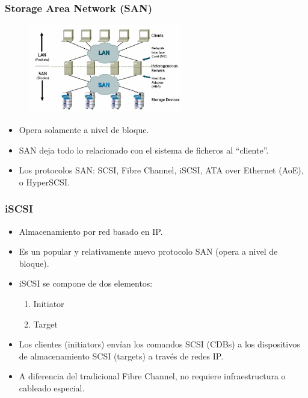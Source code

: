 \documentclass{beamer}
\begin{document}
\begin{frame}
  \frametitle{Storage Area Network (SAN)}

\begin{figure}[h]
\begin{center}
  \includegraphics[width=6.75cm]{figs/SAN.png}
\end{center}
\end{figure}

  \begin{itemize}
    \item Opera solamente a \alert{nivel de bloque}. 
     \item SAN deja todo lo relacionado con el sistema de ficheros al ``cliente''.
    \item Los protocolos SAN: SCSI, Fibre Channel, iSCSI, ATA over Ethernet (AoE), o HyperSCSI.
  \end{itemize}


\end{frame}


\begin{frame}
  \frametitle{iSCSI}
  \begin{itemize}
    \item Almacenamiento por red basado en IP.
    \item Es un popular y relativamente nuevo protocolo SAN (opera a nivel de bloque).
    \item  iSCSI se compone de dos elementos:
  \begin{enumerate}
	\item Initiator
	\item Target
  \end{enumerate}
    \item Los clientes (\alert{initiators}) envían los comandos SCSI (CDBs) a los dispositivos de almacenamiento SCSI (\alert{targets}) a través de redes IP.
    \item A diferencia del tradicional Fibre Channel, no requiere infraestructura o cableado especial.
  \end{itemize}
\end{frame}
\end{document}
